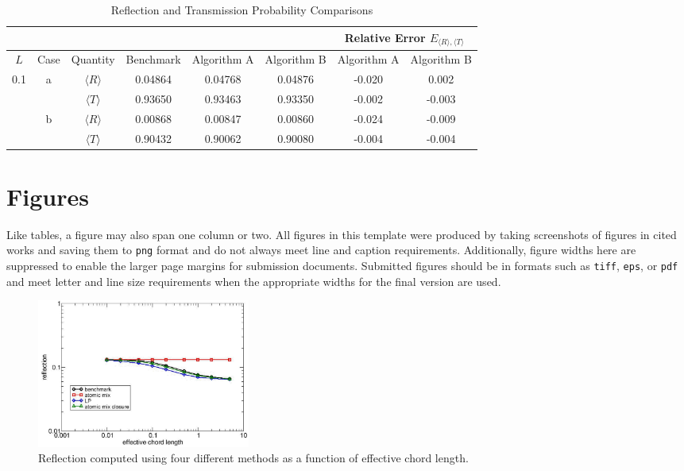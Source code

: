 \documentclass{article}                                                                           %
\begin{document}
\begin{table}[b]%
\centering
\caption{Reflection and Transmission Probability Comparisons}
\label{tab:results}
\begin{tabular}{|c|c|c|c|c|c|c|c|}
\hline
            &         &              &                 &                   &                  & \multicolumn{2}{c|}{Relative Error $E_{\langle R \rangle,\langle T \rangle}$} \\\hline
    \(L\)   & Case & Quantity & Benchmark & Algorithm A & Algorithm B & Algorithm A & Algorithm B \\ \hline \hline
    \multirow{4}{*}{0.1}   & \multirow{2}{*}{a} & \(\langle R \rangle\) & 0.04864 & 0.04768 & 0.04876 & -0.020 & 0.002 \\
                                     &                              & \(\langle T \rangle\) & 0.93650 & 0.93463 & 0.93350 & -0.002 & -0.003 \\ \cline{2-8}
                                     & \multirow{2}{*}{b} & \(\langle R \rangle\) & 0.00868 & 0.00847 & 0.00860 & -0.024 & -0.009 \\
                                     &                              & \(\langle T \rangle\) & 0.90432 & 0.90062 & 0.90080 & -0.004 & -0.004 \\ \hline
\end{tabular}
\end{table}



\section{Figures}
\label{sec:figures}

Like tables, a figure may also span one column or two.
All figures in this template were produced by taking screenshots of figures in cited works and saving them to \texttt{png} format and do not always meet line and caption requirements.
Additionally, figure widths here are suppressed to enable the larger page margins for submission documents.
Submitted figures should be in formats such as \texttt{tiff}, \texttt{eps}, or \texttt{pdf} and meet letter and line size requirements when the appropriate widths for the final version are used.

\begin{figure}[t]%
  \centering
  \includegraphics[trim = 10mm 0mm 15mm 15mm, width=70mm]{AMClosure.PNG}
  \caption{Reflection computed using four different methods as a function of effective chord length.}
  \label{fig:AMClosure}
\end{figure}
\end{document}
